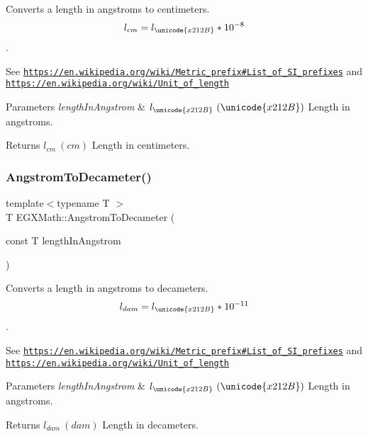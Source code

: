Converts a length in angstroms to centimeters. \[ l_{cm}=l_{\unicode{x212B}} * 10^{-8} \]. 

See \href{https://en.wikipedia.org/wiki/Metric_prefix#List_of_SI_prefixes}{\tt https\+://en.\+wikipedia.\+org/wiki/\+Metric\+\_\+prefix\#\+List\+\_\+of\+\_\+\+S\+I\+\_\+prefixes} and \href{https://en.wikipedia.org/wiki/Unit_of_length}{\tt https\+://en.\+wikipedia.\+org/wiki/\+Unit\+\_\+of\+\_\+length} 
\begin{DoxyParams}{Parameters}
{\em length\+In\+Angstrom} & $ l_{\unicode{x212B}}\ (\unicode{x212B})$ Length in angstroms. \\
\hline
\end{DoxyParams}
\begin{DoxyReturn}{Returns}
$ l_{cm}\ (cm)$ Length in centimeters. 
\end{DoxyReturn}
\mbox{\label{group___e_g_x_math-_conversions-_length_conversions-_non-_s_i-_angstrom-_s_i_gad6c324d7dcb665375853d7ee463bfdbc}} 
\subsubsection{\texorpdfstring{Angstrom\+To\+Decameter()}{AngstromToDecameter()}}
{\footnotesize\ttfamily template$<$typename T $>$ \\
T E\+G\+X\+Math\+::\+Angstrom\+To\+Decameter (\begin{DoxyParamCaption}\item[{const T}]{length\+In\+Angstrom }\end{DoxyParamCaption})}



Converts a length in angstroms to decameters. \[ l_{dam}=l_{\unicode{x212B}} * 10^{-11} \]. 

See \href{https://en.wikipedia.org/wiki/Metric_prefix#List_of_SI_prefixes}{\tt https\+://en.\+wikipedia.\+org/wiki/\+Metric\+\_\+prefix\#\+List\+\_\+of\+\_\+\+S\+I\+\_\+prefixes} and \href{https://en.wikipedia.org/wiki/Unit_of_length}{\tt https\+://en.\+wikipedia.\+org/wiki/\+Unit\+\_\+of\+\_\+length} 
\begin{DoxyParams}{Parameters}
{\em length\+In\+Angstrom} & $ l_{\unicode{x212B}}\ (\unicode{x212B})$ Length in angstroms. \\
\hline
\end{DoxyParams}
\begin{DoxyReturn}{Returns}
$ l_{dam}\ (dam)$ Length in decameters. 
\end{DoxyReturn}
\mbox{\label{group___e_g_x_math-_conversions-_length_conversions-_non-_s_i-_angstrom-_s_i_ga66b9d49fe6c0224b619d1c53e43acd23}} 
